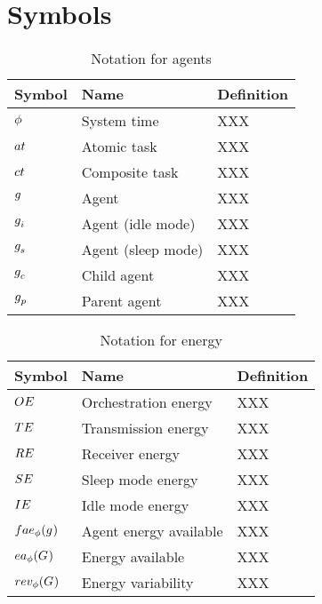 \section{Symbols}

\begin{table}[pos=htp]
	\begin{tabular}{|p{}|p{}|p{}|}
		\hline
		Symbol & Name & Definition \\
		\hline
		$\phi$ & System time & XXX \\
		$\varAtomicTask{}{}$ & Atomic task & XXX \\
		$\varCompositeTask{}{}$ & Composite task & XXX \\
		$g_{}^{}$ & Agent & XXX \\
		$g_{i}^{}$ & Agent (idle mode) & XXX \\
		$g_{s}^{}$ & Agent (sleep mode) & XXX \\
		$g_{c}^{}$ & Child agent & XXX \\
		$g_{p}^{}$ & Parent agent & XXX \\
		\hline
	\end{tabular}
	\caption{Notation for agents}
\end{table}

\begin{table}[pos=htp]
	\begin{tabular}{|p{}|p{}|p{}|}
		\hline
		Symbol & Name & Definition \\
		\hline
		$OE$ & Orchestration energy & XXX \\
		$TE$ & Transmission energy & XXX \\
		$RE$ & Receiver energy & XXX \\
		$SE$ & Sleep mode energy & XXX \\
		$IE$ & Idle mode energy & XXX \\
		$\functionAgentEnergyAvailable{}{}$ & Agent energy available & XXX \\
		$\functionEnergyAvailable{}{}$ & Energy available & XXX \\
		$\functionEnergyVariability{}{}$ & Energy variability& XXX \\
		\hline
	\end{tabular}
	\caption{Notation for energy}
\end{table}


